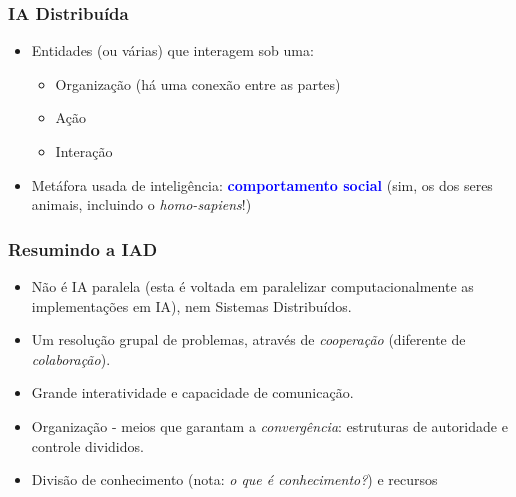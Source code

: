 \begin{frame} %


\frametitle{IA Distribuída}

\begin{itemize}
  \item Entidades (ou várias) que interagem sob uma:
  \begin{itemize}
    \item Organização (há uma conexão entre as partes)
     \item Ação 
     \item Interação
  \end{itemize}

     \item Metáfora usada de inteligência: \textcolor{blue}{\textbf{comportamento  social}} (sim, os dos seres animais, incluindo o \textit{homo-sapiens}!)
\end{itemize}


\end{frame}


\begin{frame} %


\frametitle{Resumindo a IAD}

\begin{itemize}
    \item Não é IA paralela (esta é voltada em paralelizar computacionalmente as implementações em IA), nem Sistemas Distribuídos. 
  
    \item Um resolução grupal de problemas, através de  \textit{cooperação} (diferente de \textit{colaboração}).
    
    \item Grande interatividade e capacidade de comunicação.

     \item Organização - meios que garantam a \textit{convergência}: 
      estruturas de autoridade e controle divididos. 

     \item Divisão de conhecimento (nota: \textit{o que é conhecimento?}) e recursos
     
\end{itemize}


\end{frame}



